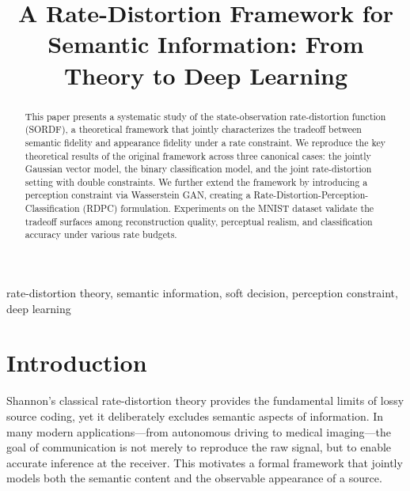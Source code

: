 \documentclass[conference]{IEEEtran}
\begin{document}
\title{A Rate-Distortion Framework for Semantic Information: From Theory to Deep Learning}

\author{
}

\maketitle

\begin{abstract}
This paper presents a systematic study of the state-observation rate-distortion function (SORDF), a theoretical framework that jointly characterizes the tradeoff between semantic fidelity and appearance fidelity under a rate constraint. We reproduce the key theoretical results of the original framework across three canonical cases: the jointly Gaussian vector model, the binary classification model, and the joint rate-distortion setting with double constraints. We further extend the framework by introducing a perception constraint via Wasserstein GAN, creating a Rate-Distortion-Perception-Classification (RDPC) formulation. Experiments on the MNIST dataset validate the tradeoff surfaces among reconstruction quality, perceptual realism, and classification accuracy under various rate budgets.
\end{abstract}

\begin{IEEEkeywords}
rate-distortion theory, semantic information, soft decision, perception constraint, deep learning
\end{IEEEkeywords}

\section{Introduction}

Shannon's classical rate-distortion theory provides the fundamental limits of lossy source coding, yet it deliberately excludes semantic aspects of information. In many modern applications---from autonomous driving to medical imaging---the goal of communication is not merely to reproduce the raw signal, but to enable accurate inference at the receiver. This motivates a formal framework that jointly models both the semantic content and the observable appearance of a source.
\end{document}
